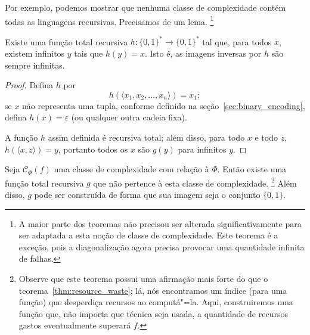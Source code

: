 Por exemplo,
podemos mostrar que
nenhuma classe de complexidade contém todas as linguagens recursivas.
Precisamos de um lema.%
\footnote{
    A maior parte dos teoremas não precisou ser alterada significativamente
    para ser adaptada a esta noção de classe de complexidade.
    Este teorema é a exceção,
    pois a diagonalização agora precisa provocar uma quantidade infinita de falhas.
}

\begin{lemma}
    Existe uma função total recursiva $h: \{0, 1\}^* \to \{0, 1\}^*$
    tal que, para todos $x$,
    existem infinitos $y$ tais que $h(y) = x$.
    Isto é, as imagens inversas por $h$ são sempre infinitas.
\end{lemma}

\begin{proof}
    Defina $h$ por
    \begin{equation*}
        h( \langle x_1, x_2, \dots, x_n \rangle ) = x_1;
    \end{equation*}
    se $x$ não representa uma tupla,
    conforme definido na seção~\ref{sec:binary_encoding},
    defina $h(x) = \varepsilon$
    (ou qualquer outra cadeia fixa).

    A função $h$ assim definida é recursiva total;
    além disso, para todo $x$ e todo $z$,
    $h(\langle x, z \rangle) = y$,
    portanto todos os $x$ são $g(y)$ para infinitos $y$.
\end{proof}

\begin{theorem}
    Seja $\mathcal C_\Phi(f)$ uma classe de complexidade
    com relação à $\Phi$.
    Então existe uma função total recursiva $g$
    que não pertence à esta classe de complexidade.%
    \footnote{
        Observe que este teorema possui uma afirmação mais forte
        do que o teorema~\ref{thm:resource_waste};
        lá,
        nós encontramos um índice (para uma função)
        que desperdiça recursos ao computá"=la.
        Aqui,
        construiremos uma função que,
        não importa que técnica seja usada,
        a quantidade de recursos gastos eventualmente superará $f$.
    }
    Além disso, $g$ pode ser construída de forma que
    sua imagem seja o conjunto $\{0, 1\}$.
    \label{thm:outside_class}
\end{theorem}

